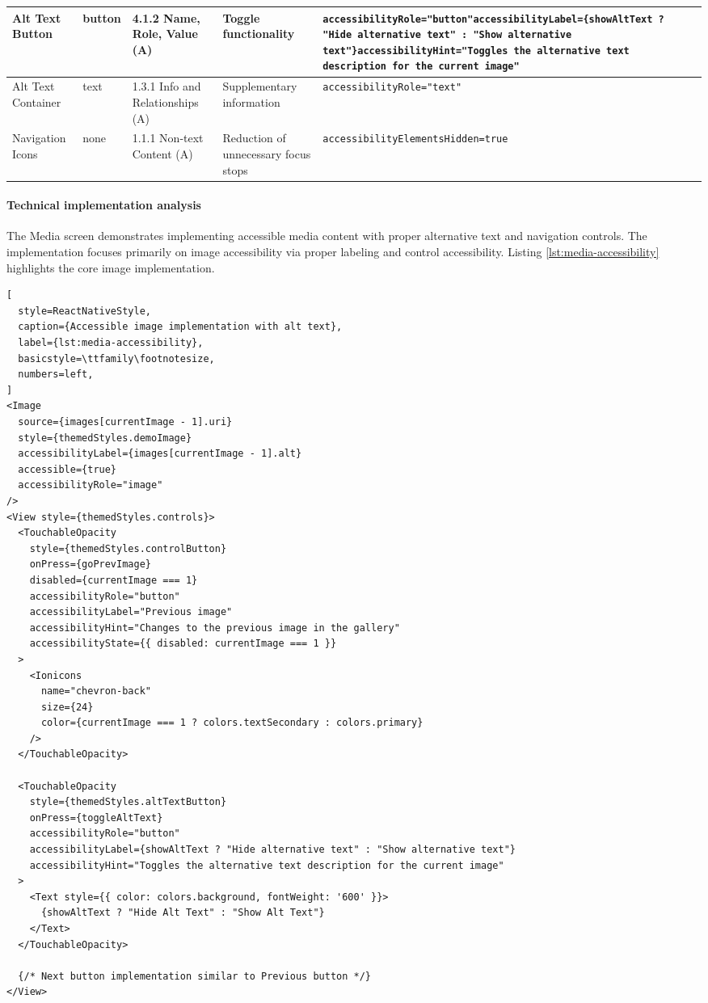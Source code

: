 \begin{longtable}{|p{2.5cm}|p{2cm}|p{2.8cm}|p{2.8cm}|p{4.3cm}|}
\hline
Alt Text Button & button & 4.1.2 Name, Role, Value (A) & Toggle functionality & \texttt{accessibilityRole="button"}\newline \texttt{accessibilityLabel=}\newline \texttt{\{showAltText ? "Hide alternative text" : "Show alternative text"\}}\newline \texttt{accessibilityHint="Toggles the alternative text description for the current image"} \\
\hline
Alt Text Container & text & 1.3.1 Info and Relationships (A) & Supplementary information & \texttt{accessibilityRole="text"} \\
\hline
Navigation Icons & none & 1.1.1 Non-text Content (A) & Reduction of unnecessary focus stops & \texttt{accessibilityElementsHidden=true} \\
\end{longtable}

\paragraph{Technical implementation analysis}

The Media screen demonstrates implementing accessible media content with proper alternative text and navigation controls. The implementation focuses primarily on image accessibility via proper labeling and control accessibility. Listing \ref{lst:media-accessibility} highlights the core image implementation.

\begin{lstlisting}[
  style=ReactNativeStyle,
  caption={Accessible image implementation with alt text},
  label={lst:media-accessibility},
  basicstyle=\ttfamily\footnotesize,
  numbers=left,
]
<Image
  source={images[currentImage - 1].uri}
  style={themedStyles.demoImage}
  accessibilityLabel={images[currentImage - 1].alt}
  accessible={true}
  accessibilityRole="image"
/>
<View style={themedStyles.controls}>
  <TouchableOpacity
    style={themedStyles.controlButton}
    onPress={goPrevImage}
    disabled={currentImage === 1}
    accessibilityRole="button"
    accessibilityLabel="Previous image"
    accessibilityHint="Changes to the previous image in the gallery"
    accessibilityState={{ disabled: currentImage === 1 }}
  >
    <Ionicons
      name="chevron-back"
      size={24}
      color={currentImage === 1 ? colors.textSecondary : colors.primary}
    />
  </TouchableOpacity>

  <TouchableOpacity
    style={themedStyles.altTextButton}
    onPress={toggleAltText}
    accessibilityRole="button"
    accessibilityLabel={showAltText ? "Hide alternative text" : "Show alternative text"}
    accessibilityHint="Toggles the alternative text description for the current image"
  >
    <Text style={{ color: colors.background, fontWeight: '600' }}>
      {showAltText ? "Hide Alt Text" : "Show Alt Text"}
    </Text>
  </TouchableOpacity>
  
  {/* Next button implementation similar to Previous button */}
</View>
\end{lstlisting}


